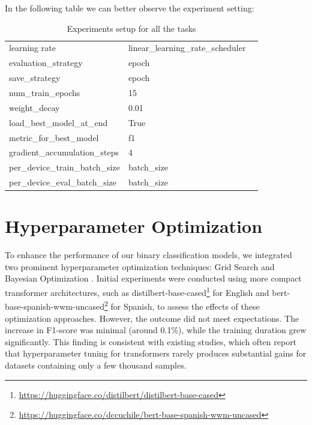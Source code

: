 \documentclass{Configuration_Files/PoliMi3i_thesis}
\begin{document}
In the following table we can better observe the experiment setting:
\begin{table}[H] %
 \centering
 \begin{tabular}{lll}
 learning rate                 & linear\_learning\_rate\_scheduler    &  \\
 evaluation\_strategy          & epoch                                &  \\
 save\_strategy                & epoch                                &  \\
 num\_train\_epochs            & 15                                   &  \\
 weight\_decay                 & 0.01                                 &  \\
 load\_best\_model\_at\_end    & True                                 &  \\
 metric\_for\_best\_model      & f1                                   &  \\
 gradient\_accumulation\_steps & 4                                    & \\
 per\_device\_train\_batch\_size   & batch\_size                      & \\
 per\_device\_eval\_batch\_size    & batch\_size                      &
 \end{tabular}
 \caption{Experiments setup for all the tasks}
 \label{tab:label_distribution}
\end{table}
\FloatBarrier 

\section{Hyperparameter Optimization} \label{sec:note_on_hyperparameter_opt}
To enhance the performance of our binary classification models, we integrated two prominent hyperparameter optimization techniques: Grid Search and Bayesian Optimization \cite{alibrahim2021hyperparameter}. Initial experiments were conducted using more compact transformer architectures, such as distilbert-base-cased\footnote{\url{https://huggingface.co/distilbert/distilbert-base-cased}} for English and 
bert-base-spanish-wwm-uncased\footnote{\url{https://huggingface.co/dccuchile/bert-base-spanish-wwm-uncased}} \cite{CaneteCFP2020} for Spanish, to assess the effects of these optimization approaches. However, the outcome did not meet expectations. The increase in F1-score was minimal (around 0.1\%), while the training duration grew significantly. This finding is consistent with existing studies, which often report that hyperparameter tuning for transformers rarely produces substantial gains for datasets containing only a few thousand samples.
\end{document}
